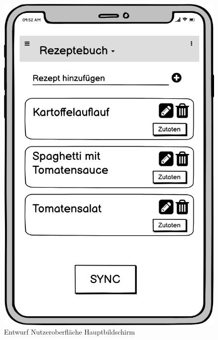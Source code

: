 \documentclass[a4paper, 12pt]{scrreprt}
\begin{document}
\begin{figure}[H]
	\centering
	\begin{minipage}{.45\textwidth}
		\centering
		\includegraphics[width=1\textwidth]{wireframeRezepte2.png}
		\caption{Entwurf Nutzeroberfläche Hauptbildschirm}
		\label{fig:rezepteFrame}
	\end{minipage}
	\hspace*{\fill}
	\begin{minipage}{.45\textwidth}
		\centering

\end{minipage}
\end{figure}
\end{document}
